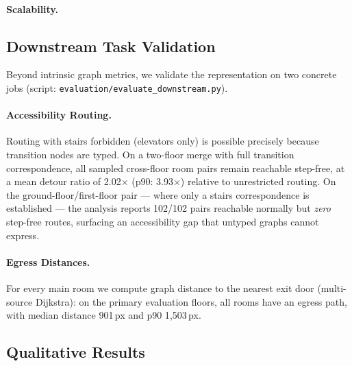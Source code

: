 \documentclass[manuscript,screen,review]{acmart}
\begin{document}
\paragraph{Scalability.}

\subsection{Downstream Task Validation}
\label{subsec:downstream}

Beyond intrinsic graph metrics, we validate the representation on two concrete jobs (script: \texttt{evaluation/evaluate\_downstream.py}).

\paragraph{Accessibility Routing.}
Routing with stairs forbidden (elevators only) is possible precisely because transition nodes are typed. On a two-floor merge with full transition correspondence, all sampled cross-floor room pairs remain reachable step-free, at a mean detour ratio of 2.02$\times$ (p90: 3.93$\times$) relative to unrestricted routing. On the ground-floor/first-floor pair --- where only a stairs correspondence is established --- the analysis reports 102/102 pairs reachable normally but \emph{zero} step-free routes, surfacing an accessibility gap that untyped graphs cannot express.

\paragraph{Egress Distances.}
For every main room we compute graph distance to the nearest exit door (multi-source Dijkstra): on the primary evaluation floors, all rooms have an egress path, with median distance 901\,px and p90 1{,}503\,px. %

\subsection{Qualitative Results}
\label{subsec:qualitative}


\end{document}
